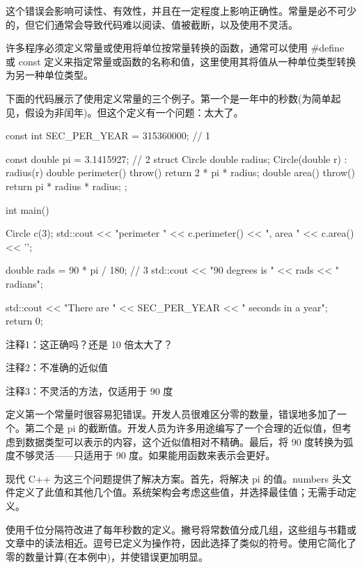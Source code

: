 这个错误会影响可读性、有效性，并且在一定程度上影响正确性。常量是必不可少的，但它们通常会导致代码难以阅读、值被截断，以及使用不灵活。


许多程序必须定义常量或使用将单位按常量转换的函数，通常可以使用 \#define 或 const 定义来指定常量或函数的名称和值，这里使用其将值从一种单位类型转换为另一种单位类型。

下面的代码展示了使用定义常量的三个例子。第一个是一年中的秒数(为简单起见，假设为非闰年)。但这个定义有一个问题：太大了。


\begin{cpp}
const int SEC_PER_YEAR = 315360000; // 1

const double pi = 3.1415927; // 2
struct Circle {
  double radius;
  Circle(double r) : radius(r) {}
  double perimeter() throw() { return 2 * pi * radius; }
  double area() throw() { return pi * radius * radius; }
};

int main() {
  Circle c(3);
  std::cout << "perimeter " << c.perimeter() << ", area " << c.area() << '\n';

  double rads = 90 * pi / 180; // 3
  std::cout << "90 degrees is " << rads << " radians\n";

  std::cout << "There are " << SEC_PER_YEAR << " seconds in a year\n";
  return 0;
}
\end{cpp}

{\footnotesize
注释1：这正确吗？还是 10 倍太大了？

注释2：不准确的近似值

注释3：不灵活的方法，仅适用于 90 度
}


定义第一个常量时很容易犯错误。开发人员很难区分零的数量，错误地多加了一个。第二个是 pi 的截断值。开发人员为许多用途编写了一个合理的近似值，但考虑到数据类型可以表示的内容，这个近似值相对不精确。最后，将 90 度转换为弧度不够灵活——只适用于 90 度。如果能用函数来表示会更好。


现代 C++ 为这三个问题提供了解决方案。首先，将解决 pi 的值。numbers 头文件定义了此值和其他几个值。系统架构会考虑这些值，并选择最佳值；无需手动定义。

使用千位分隔符改进了每年秒数的定义。撇号将常数值分成几组，这些组与书籍或文章中的读法相近。逗号已定义为操作符，因此选择了类似的符号。使用它简化了零的数量计算(在本例中)，并使错误更加明显。

